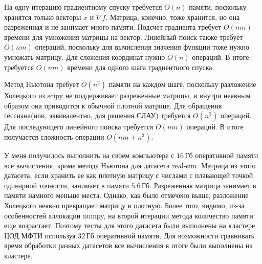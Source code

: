 \documentclass[notitlepage]{article}
\begin{document}
На одну итерацию градиентному спуску требуется $O(n)$ памяти, поскольку хранятся только векторы $x$ и $\nabla f$. 
Матрица, конечно, тоже хранится, но она разреженная и не занимает много памяти.
Подсчет градиента требует $O(nm)$ времени для умножения матрицы на вектор.
Линейный поиск также требует $O(nm)$ операций, поскольку для вычисления значения функции тоже нужно умножать матрицу.
Для сложения координат нужно $O(n)$ операций. В итоге требуется $O(nm)$ времени для одного шага градиентного спуска.

Метод Ньютона требует $O(n^2)$ памяти на каждом шаге, поскольку разложение Холецкого из scipy не поддерживает разреженные
матрицы, и внутри неявным образом она приводится к обычной плотной матрице.
Для обращения гессиана(или, эквивалентно, для решения СЛАУ) требуется $O(n^3)$ операций.
Для последующего линейного поиска требуется $O(nm)$ операций. В итоге получается сложность операции $O(nm + n^3)$.

У меня получилось выполнить на своем компьютере с $16$\,Гб оперативной памяти все вычисления, кроме метода Ньютона для
датасета real-sim.
Матрица из этого датасета, если хранить ее как плотную матрицу
с числами с плавающей точкой одинарной точности, занимает в памяти $5.6$\,Гб.
Разреженная матрица занимает в памяти намного меньше места.
Однако, как было отмечено выше, разложение Холецкого неявно превращает матрицу в плотную.
Более того, видимо, из-за особенностей аллокации numpy, на второй итерации метода количество памяти еще возрастает.
Поэтому тесты для этого датасета были выполнены на кластере ЦОД МФТИ используя $32$\,Гб оперативной памяти.
Для возможности сравнивать время обработки разных датасетов все вычисления в итоге были выполнены на кластере.
\end{document}
